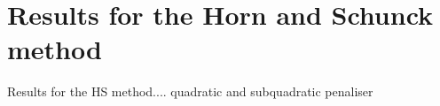 
\section{Results for the Horn and Schunck method}

Results for the HS method.... quadratic and subquadratic penaliser



